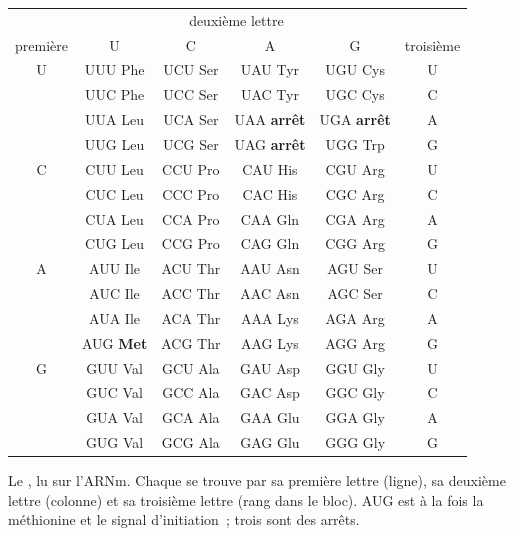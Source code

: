\begin{omfigure}
\begin{tabular}{c|cccc|c}
\multicolumn{1}{c}{} & \multicolumn{4}{c}{\small deuxième lettre} & \multicolumn{1}{c}{} \\
{\small première} & U & C & A & G & {\small troisième} \\ \hline
U & UUU Phe & UCU Ser & UAU Tyr & UGU Cys & U \\
 & UUC Phe & UCC Ser & UAC Tyr & UGC Cys & C \\
 & UUA Leu & UCA Ser & UAA \textbf{arrêt} & UGA \textbf{arrêt} & A \\
 & UUG Leu & UCG Ser & UAG \textbf{arrêt} & UGG Trp & G \\ \hline
C & CUU Leu & CCU Pro & CAU His & CGU Arg & U \\
 & CUC Leu & CCC Pro & CAC His & CGC Arg & C \\
 & CUA Leu & CCA Pro & CAA Gln & CGA Arg & A \\
 & CUG Leu & CCG Pro & CAG Gln & CGG Arg & G \\ \hline
A & AUU Ile & ACU Thr & AAU Asn & AGU Ser & U \\
 & AUC Ile & ACC Thr & AAC Asn & AGC Ser & C \\
 & AUA Ile & ACA Thr & AAA Lys & AGA Arg & A \\
 & AUG \textbf{Met} & ACG Thr & AAG Lys & AGG Arg & G \\ \hline
G & GUU Val & GCU Ala & GAU Asp & GGU Gly & U \\
 & GUC Val & GCC Ala & GAC Asp & GGC Gly & C \\
 & GUA Val & GCA Ala & GAA Glu & GGA Gly & A \\
 & GUG Val & GCG Ala & GAG Glu & GGG Gly & G \\
\end{tabular}

{\small Le , lu sur l'ARNm. Chaque  se trouve par sa
première lettre (ligne), sa deuxième lettre (colonne) et sa troisième
lettre (rang dans le bloc). AUG est à la fois la méthionine et le
signal d'initiation~; trois  sont des arrêts.}
\end{omfigure}

